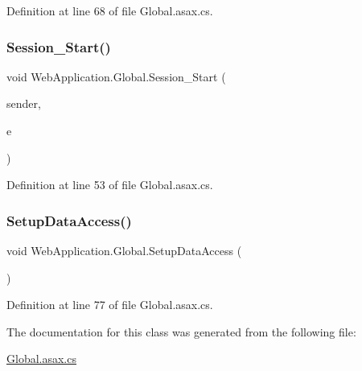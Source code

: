 Definition at line 68 of file Global.\+asax.\+cs.

\mbox{\label{classWebApplication_1_1Global_ab2e5cb6155c6759fc0d1a87d7df1668c}} 
\subsubsection{\texorpdfstring{Session\_Start()}{Session\_Start()}}
{\footnotesize\ttfamily void Web\+Application.\+Global.\+Session\+\_\+\+Start (\begin{DoxyParamCaption}\item[{object}]{sender,  }\item[{Event\+Args}]{e }\end{DoxyParamCaption})\hspace{0.3cm}{\ttfamily [protected]}}



Definition at line 53 of file Global.\+asax.\+cs.

\mbox{\label{classWebApplication_1_1Global_a51f7c694be3dcc6ebd0a1ed4d6b6c337}} 
\subsubsection{\texorpdfstring{SetupDataAccess()}{SetupDataAccess()}}
{\footnotesize\ttfamily void Web\+Application.\+Global.\+Setup\+Data\+Access (\begin{DoxyParamCaption}{ }\end{DoxyParamCaption})\hspace{0.3cm}{\ttfamily [protected]}}



Definition at line 77 of file Global.\+asax.\+cs.



The documentation for this class was generated from the following file\+:\begin{DoxyCompactItemize}
\item 
\mbox{\hyperlink{Global_8asax_8cs}{Global.\+asax.\+cs}}\end{DoxyCompactItemize}
